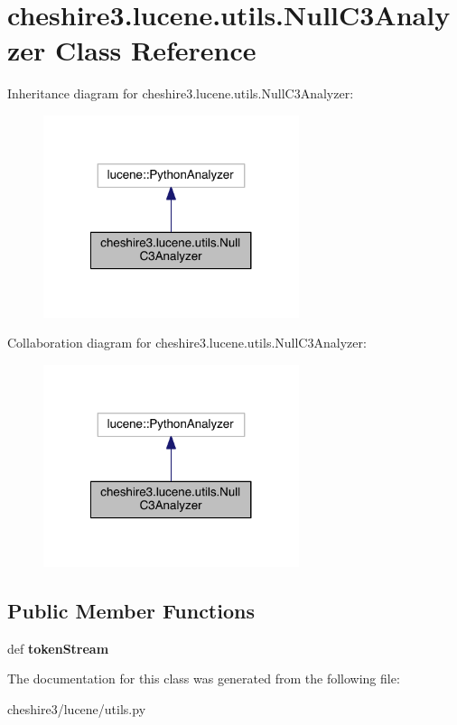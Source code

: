 \hypertarget{classcheshire3_1_1lucene_1_1utils_1_1_null_c3_analyzer}{\section{cheshire3.\-lucene.\-utils.\-Null\-C3\-Analyzer Class Reference}
\label{classcheshire3_1_1lucene_1_1utils_1_1_null_c3_analyzer}
}


Inheritance diagram for cheshire3.\-lucene.\-utils.\-Null\-C3\-Analyzer\-:
\nopagebreak
\begin{figure}[H]
\begin{center}
\leavevmode
\includegraphics[width=212pt]{classcheshire3_1_1lucene_1_1utils_1_1_null_c3_analyzer__inherit__graph}
\end{center}
\end{figure}


Collaboration diagram for cheshire3.\-lucene.\-utils.\-Null\-C3\-Analyzer\-:
\nopagebreak
\begin{figure}[H]
\begin{center}
\leavevmode
\includegraphics[width=212pt]{classcheshire3_1_1lucene_1_1utils_1_1_null_c3_analyzer__coll__graph}
\end{center}
\end{figure}
\subsection*{Public Member Functions}
\begin{DoxyCompactItemize}
\item 
\hypertarget{classcheshire3_1_1lucene_1_1utils_1_1_null_c3_analyzer_a02f7efbae2c76cb218f061bc6d7ac373}{def {\bfseries token\-Stream}}\label{classcheshire3_1_1lucene_1_1utils_1_1_null_c3_analyzer_a02f7efbae2c76cb218f061bc6d7ac373}

\end{DoxyCompactItemize}


The documentation for this class was generated from the following file\-:\begin{DoxyCompactItemize}
\item 
cheshire3/lucene/utils.\-py\end{DoxyCompactItemize}
